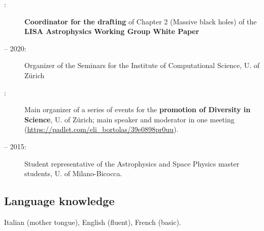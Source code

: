 \begin{description}

    \item[ :] \textbf{Coordinator for the drafting} of Chapter 2 (Massive black holes) of the \textbf{LISA Astrophysics Working Group White Paper}

    \item[  -- 2020:] Organizer of the Seminars for the Institute of Computational Science, U. of Z\"urich
    
    \item[ :] Main organizer of a series of  events  for the \textbf{promotion of Diversity in Science}, U. of Z\"urich; main speaker and moderator in one meeting (\href{https://padlet.com/eli_bortolas/39e0898pr0uu}{https://padlet.com/eli\_bortolas/39e0898pr0uu}).

    \item[  -- 2015:] Student representative of the Astrophysics and Space Physics master students, U. of Milano-Bicocca.
    
\end{description}


\subsection*{Language knowledge}
Italian (mother tongue), English (fluent), French (basic).%

